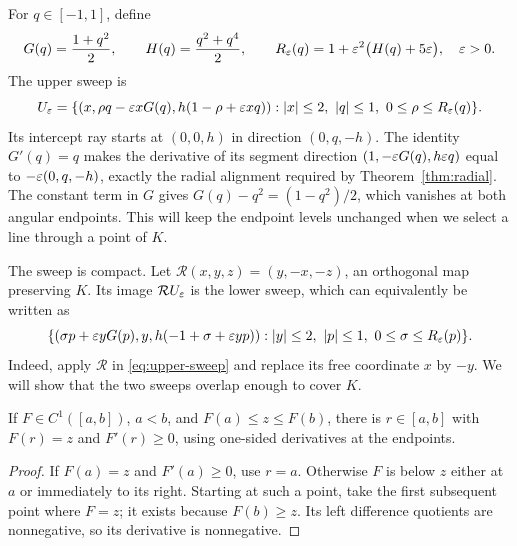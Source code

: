 For $q\in[-1,1]$, define
\[
 G(q)=\frac{1+q^2}{2},\qquad H(q)=\frac{q^2+q^4}{2},\qquad
 R_\varepsilon(q)=1+\varepsilon^2\bigl(H(q)+5\varepsilon\bigr),\quad \varepsilon>0.
\]
The upper sweep is
\begin{equation}\label{eq:upper-sweep}
 U_\varepsilon=\{(x,\rho q-\varepsilon xG(q),
                     h(1-\rho+\varepsilon xq)):
       |x|\le2,\ |q|\le1,\ 0\le\rho\le R_\varepsilon(q)\}.
\end{equation}
Its intercept ray starts at $(0,0,h)$ in direction $(0,q,-h)$.
The identity $G'(q)=q$ makes the derivative of its segment direction
$(1,-\varepsilon G(q),h\varepsilon q)$ equal to $-\varepsilon(0,q,-h)$, exactly
the radial alignment required by Theorem~\ref{thm:radial}.
The constant term in $G$ gives
$G(q)-q^2=(1-q^2)/2$, which vanishes at both angular endpoints.
This will keep the endpoint levels unchanged when we select a line
through a point of $K$.

The sweep is compact. Let $\mathcal R(x,y,z)=(y,-x,-z)$, an orthogonal
map preserving $K$. Its image $\mathcal R U_\varepsilon$ is the lower
sweep, which can equivalently be written as
\begin{equation}\label{eq:lower-sweep}
 \{(\sigma p+\varepsilon yG(p),y,h(-1+\sigma+\varepsilon yp)):
       |y|\le2,\ |p|\le1,\ 0\le\sigma\le R_\varepsilon(p)\}.
\end{equation}
Indeed, apply $\mathcal R$ in \eqref{eq:upper-sweep} and replace
its free coordinate $x$ by $-y$. We will show that the two sweeps
overlap enough to cover $K$.

\begin{lemma}\label{lem:crossing}
If $F\in C^1([a,b])$, $a<b$, and $F(a)\le z\le F(b)$,
there is $r\in[a,b]$ with $F(r)=z$ and $F'(r)\ge0$,
using one-sided derivatives at the endpoints.
\end{lemma}
\begin{proof}
If $F(a)=z$ and $F'(a)\ge0$, use $r=a$.
Otherwise $F$ is below $z$ either at $a$ or immediately to its
right. Starting at such a point, take the first subsequent point
where $F=z$; it exists because $F(b)\ge z$. Its left difference
quotients are nonnegative, so its derivative is nonnegative.
\end{proof}

